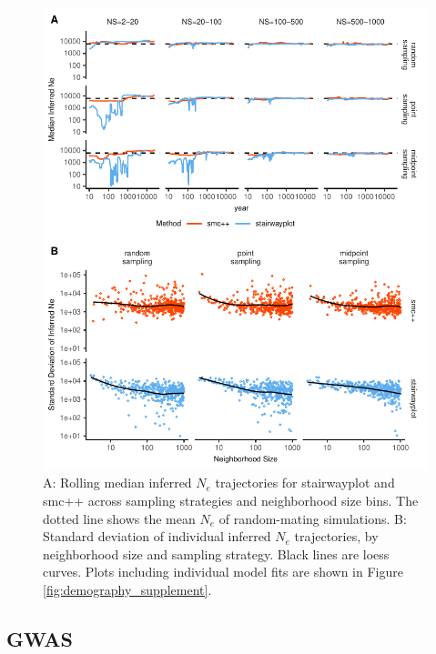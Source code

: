 \documentclass[10pt,twoside,lineno,hidelinks]{preprint}
\begin{document}
\begin{figure}[p]
\centering
\includegraphics[width=\textwidth]{figures/demography_rollmedian_w_variance.pdf}
\caption{A: Rolling median inferred $N_{e}$ trajectories for stairwayplot and smc++ across sampling strategies and neighborhood size bins. The dotted line shows the mean $N_{e}$ of random-mating simulations. B: Standard deviation of individual inferred $N_{e}$ trajectories, by neighborhood size and sampling strategy. Black lines are loess curves. Plots including individual model fits are shown in Figure \ref{fig:demography_supplement}.}
\label{fig:demography}
\end{figure}

\subsection{GWAS}
\end{document}
